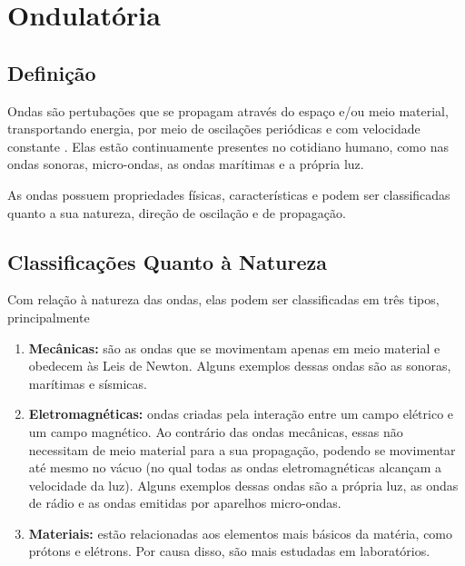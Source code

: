 \chapter{Ondulatória}

    \label{cap:ond}

	\section{Definição}
		Ondas são pertubações que se propagam através do espaço e/ou meio material, transportando energia, por meio de oscilações periódicas e com velocidade constante \cite{moises}. 
		Elas estão continuamente presentes no cotidiano humano, como nas ondas sonoras, micro-ondas, as ondas marítimas e a própria luz.
		
		As ondas possuem propriedades físicas, características e podem ser classificadas quanto a sua natureza, direção de oscilação e de propagação.
		
	\section{Classificações Quanto à Natureza}
		Com relação à natureza das ondas, elas podem ser classificadas em três tipos, principalmente \cite{halliday}
		\begin{enumerate}
			\item\textbf{Mecânicas: }são as ondas que se movimentam apenas em meio material e obedecem às Leis de Newton. Alguns exemplos dessas ondas são as sonoras, marítimas e sísmicas.

			\item\textbf{Eletromagnéticas: }ondas criadas pela interação entre um campo elétrico e um campo magnético. Ao contrário das ondas mecânicas, essas não necessitam de meio material para a sua propagação, podendo se movimentar até mesmo no vácuo (no qual todas as ondas eletromagnéticas alcançam a velocidade da luz). Alguns exemplos dessas ondas são a própria luz, as ondas de rádio e as ondas emitidas por aparelhos micro-ondas.
			
			\item\textbf{Materiais: }estão relacionadas aos elementos mais básicos da matéria, como prótons e elétrons. Por causa disso, são mais estudadas em laboratórios.
		\end{enumerate}
		
